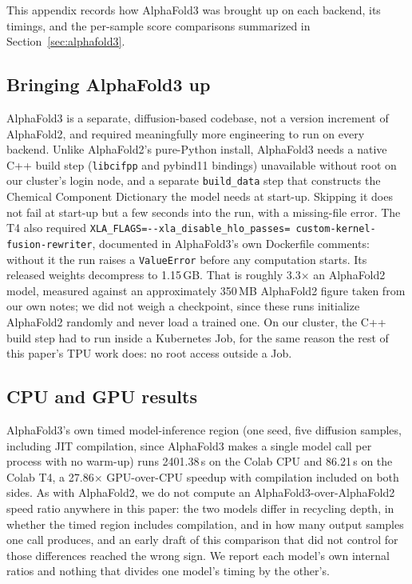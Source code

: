 
This appendix records how AlphaFold3 was brought up on each backend,
its timings, and the per-sample score comparisons summarized in
Section~\ref{sec:alphafold3}.

\subsection{Bringing AlphaFold3 up}
\label{app:af3-infra}

AlphaFold3 is a separate, diffusion-based codebase, not a version
increment of AlphaFold2, and required meaningfully more engineering to
run on every backend. Unlike AlphaFold2's pure-Python install,
AlphaFold3 needs a native C++ build step (\texttt{libcifpp} and pybind11
bindings) unavailable without root on our cluster's login node, and a
separate \texttt{build\_data} step that constructs the Chemical Component
Dictionary the model needs at start-up. Skipping it does not fail at
start-up but a few seconds into the run, with a missing-file error. The T4
also required \texttt{XLA\_FLAGS=-{}-xla\_disable\_hlo\_passes=%
custom-kernel-fusion-rewriter}, documented in AlphaFold3's own
Dockerfile comments: without it the run raises a \texttt{ValueError}
before any computation starts. Its
released weights decompress to 1.15\,GB. That is roughly 3.3$\times$ an
AlphaFold2 model, measured against an approximately 350\,MB AlphaFold2
figure taken from our own notes; we did not weigh a checkpoint, since
these runs initialize AlphaFold2 randomly and never load a trained
one.
On our cluster, the C++ build step had to run inside a Kubernetes Job,
for the same reason the rest of this paper's
TPU work does: no root access outside a Job.

\subsection{CPU and GPU results}
\label{sec:af3-cpuresults}

AlphaFold3's own timed model-inference region (one seed, five diffusion
samples, including JIT compilation, since AlphaFold3 makes a single
model call per process with no warm-up) runs 2401.38\,s on the Colab
CPU and 86.21\,s on the Colab T4, a 27.86$\times$ GPU-over-CPU speedup
with compilation included on both sides.
As with AlphaFold2, we do not compute an AlphaFold3-over-AlphaFold2
speed ratio anywhere in this paper: the two models differ in recycling
depth, in whether the timed region includes compilation, and in how
many output samples one call produces, and an early draft of this
comparison that did not control for those differences reached the
wrong sign. We report each model's own internal ratios and nothing that
divides one model's timing by the other's.

